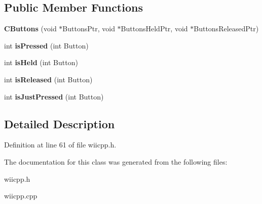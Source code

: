 \subsection*{\-Public \-Member \-Functions}
\begin{DoxyCompactItemize}
\item 
\hypertarget{class_c_buttons_ae5c226df45be410d158a792510af7f17}{{\bfseries \-C\-Buttons} (void $\ast$\-Buttons\-Ptr, void $\ast$\-Buttons\-Held\-Ptr, void $\ast$\-Buttons\-Released\-Ptr)}\label{class_c_buttons_ae5c226df45be410d158a792510af7f17}

\item 
\hypertarget{class_c_button_base_a0d4758b9e756a8c3c2bb39b907ea9170}{int {\bfseries is\-Pressed} (int \-Button)}\label{class_c_button_base_a0d4758b9e756a8c3c2bb39b907ea9170}

\item 
\hypertarget{class_c_button_base_a67e38daead9d22e33f6a3d85902d1f98}{int {\bfseries is\-Held} (int \-Button)}\label{class_c_button_base_a67e38daead9d22e33f6a3d85902d1f98}

\item 
\hypertarget{class_c_button_base_a575dee487bcca1abf29c1084dfdd5bb8}{int {\bfseries is\-Released} (int \-Button)}\label{class_c_button_base_a575dee487bcca1abf29c1084dfdd5bb8}

\item 
\hypertarget{class_c_button_base_ab74fd21217c5e379a613b7474af4f9b8}{int {\bfseries is\-Just\-Pressed} (int \-Button)}\label{class_c_button_base_ab74fd21217c5e379a613b7474af4f9b8}

\end{DoxyCompactItemize}


\subsection{\-Detailed \-Description}


\-Definition at line 61 of file wiicpp.\-h.



\-The documentation for this class was generated from the following files\-:\begin{DoxyCompactItemize}
\item 
wiicpp.\-h\item 
wiicpp.\-cpp\end{DoxyCompactItemize}
